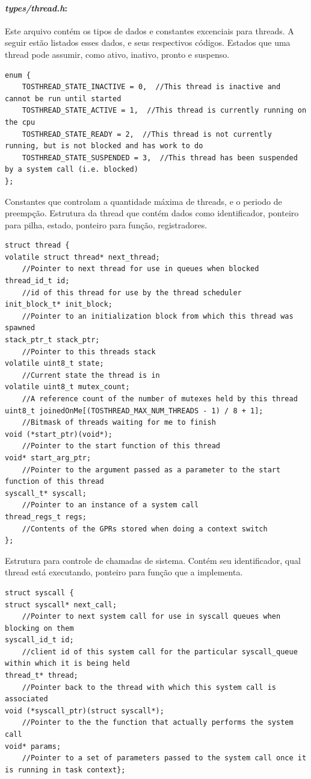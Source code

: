 \paragraph{\textit{types/thread.h}:} 
Este arquivo contém os tipos de dados e constantes excenciais para threads. A seguir estão listados esses dados, e seus
respectivos códigos.
Estados que uma thread pode assumir, como ativo, inativo, pronto e suspenso.
\begin{lstlisting}
enum {
    TOSTHREAD_STATE_INACTIVE = 0,  //This thread is inactive and cannot be run until started
    TOSTHREAD_STATE_ACTIVE = 1,  //This thread is currently running on the cpu
    TOSTHREAD_STATE_READY = 2,  //This thread is not currently running, but is not blocked and has work to do 
    TOSTHREAD_STATE_SUSPENDED = 3,  //This thread has been suspended by a system call (i.e. blocked)
};
\end{lstlisting}
Constantes que controlam a quantidade máxima de threads, e o periodo de preempção.
\label{thread_t}Estrutura da thread que contém dados como identificador, ponteiro para pilha, estado, ponteiro para função,
registradores.
\begin{lstlisting}
struct thread {
volatile struct thread* next_thread;  
    //Pointer to next thread for use in queues when blocked
thread_id_t id;                       
    //id of this thread for use by the thread scheduler
init_block_t* init_block;             
    //Pointer to an initialization block from which this thread was spawned
stack_ptr_t stack_ptr;                
    //Pointer to this threads stack
volatile uint8_t state;               
    //Current state the thread is in
volatile uint8_t mutex_count;         
    //A reference count of the number of mutexes held by this thread
uint8_t joinedOnMe[(TOSTHREAD_MAX_NUM_THREADS - 1) / 8 + 1]; 
    //Bitmask of threads waiting for me to finish
void (*start_ptr)(void*);             
    //Pointer to the start function of this thread
void* start_arg_ptr;                  
    //Pointer to the argument passed as a parameter to the start function of this thread
syscall_t* syscall;                   
    //Pointer to an instance of a system call
thread_regs_t regs;                   
    //Contents of the GPRs stored when doing a context switch
};
\end{lstlisting}
Estrutura para controle de chamadas de sistema. Contém seu identificador, qual thread está executando, 
ponteiro para função que a implementa.
\begin{lstlisting}
struct syscall {
struct syscall* next_call;        
    //Pointer to next system call for use in syscall queues when blocking on them
syscall_id_t id;                  
    //client id of this system call for the particular syscall_queue within which it is being held
thread_t* thread;                 
    //Pointer back to the thread with which this system call is associated
void (*syscall_ptr)(struct syscall*);   
    //Pointer to the the function that actually performs the system call
void* params;                     
    //Pointer to a set of parameters passed to the system call once it is running in task context};
\end{lstlisting}
